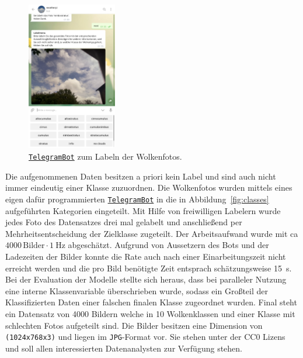 \begin{figure}
		\vspace{-1.4cm}
		\centering
		\includegraphics[width=0.35\textwidth]{pictures/telegram.pdf}
		\caption{\href{https://telegram.me/weatherpi_bot}{\texttt{TelegramBot}} zum Labeln der Wolkenfotos.}
		\label{fig:}
		\vspace{-1.0cm}
\end{figure}
Die aufgenommenen Daten besitzen a priori kein Label und sind auch nicht immer
eindeutig einer Klasse zuzuordnen.
Die Wolkenfotos wurden mittels eines eigen dafür programmierten
\href{https://telegram.me/weatherpi_bot}{\texttt{TelegramBot}} in
die in Abbildung~\ref{fig:classes} aufgeführten Kategorien eingeteilt.
Mit Hilfe von freiwilligen Labelern wurde jedes Foto des Datensatzes drei mal
gelabelt und anschließend per Mehrheitsentscheidung der Zielklasse 
zugeteilt.
Der Arbeitsaufwand wurde mit ca $\num{4000} \, \text{Bilder} \cdot \SI{1}{\hertz}$
abgeschätzt.
Aufgrund von Aussetzern des Bots und der Ladezeiten der Bilder konnte die Rate
auch nach einer Einarbeitungszeit nicht erreicht werden und die pro Bild benötigte Zeit entsprach schätzungsweise
\SI{15}{\second}.
Bei der Evaluation der Modelle stellte sich heraus, dass bei paralleler Nutzung
eine interne Klassenvariable überschrieben wurde, sodass ein Großteil der
Klassifizierten Daten einer falschen finalen Klasse zugeordnet wurden. 
Final steht ein Datensatz von \num{4000} Bildern welche in 10 Wolkenklassen und
einer Klasse mit schlechten Fotos aufgeteilt sind. Die Bilder besitzen eine Dimension 
von \texttt{(1024x768x3)} und liegen im \texttt{JPG}-Format vor.
Sie stehen unter der CC0 Lizens \cite{lizens} und soll allen interessierten 
Datenanalysten zur Verfügung stehen.

